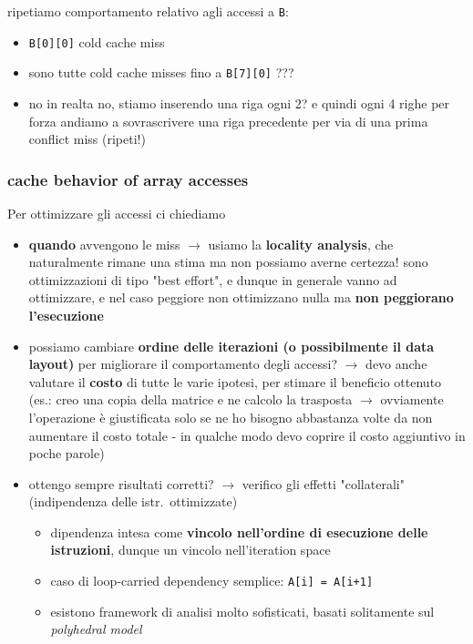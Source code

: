 ripetiamo comportamento relativo agli accessi a \lstinline|B|:
\begin{itemize}
  \item \lstinline|B[0][0]| cold cache miss
  \item sono tutte cold cache misses fino a \lstinline|B[7][0]| ???
  \item no in realta no, stiamo inserendo una riga ogni 2? e quindi ogni 4 righe per forza andiamo a sovrascrivere una riga precedente per via di una prima conflict miss (ripeti!)
\end{itemize}

\subsubsection{cache behavior of array accesses}

Per ottimizzare gli accessi ci chiediamo 
\begin{itemize}
  \item \textbf{quando} avvengono le miss $\rightarrow$ usiamo la \textbf{locality analysis}, che naturalmente rimane una stima ma non possiamo averne certezza! sono ottimizzazioni di tipo "best effort", e dunque in generale vanno ad ottimizzare, e nel caso peggiore non ottimizzano nulla ma \textbf{non peggiorano l'esecuzione}
  \item possiamo cambiare \textbf{ordine delle iterazioni (o possibilmente il data layout)} per migliorare il comportamento degli accessi? $\rightarrow$ devo anche valutare il \textbf{costo} di tutte le varie ipotesi, per stimare il beneficio ottenuto (es.: creo una copia della matrice e ne calcolo la trasposta $\rightarrow$ ovviamente l'operazione \`e giustificata solo se ne ho bisogno abbastanza volte da non aumentare il costo totale - in qualche modo devo coprire il costo aggiuntivo in poche parole)
  \item ottengo sempre risultati corretti? $\rightarrow$ verifico gli effetti "collaterali" (indipendenza delle istr.~ottimizzate)
    \begin{itemize}
      \item dipendenza intesa come \textbf{vincolo nell'ordine di esecuzione delle istruzioni}, dunque un vincolo nell'iteration space
    \item caso di loop-carried dependency semplice: \lstinline|A[i] = A[i+1]|
      \item esistono framework di analisi molto sofisticati, basati solitamente sul \textit{polyhedral model}
    \end{itemize}
\end{itemize}

